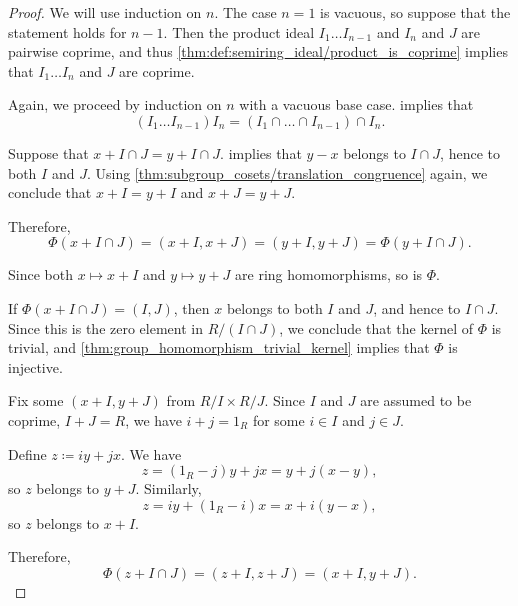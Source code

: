 \begin{proof}
   We will use induction on \( n \). The case \( n = 1 \) is vacuous, so suppose that the statement holds for \( n - 1 \). Then the product ideal \( I_1 \ldots I_{n-1} \) and \( I_n \) and \( J \) are pairwise coprime, and thus \cref{thm:def:semiring_ideal/product_is_coprime} implies that \( I_1 \ldots I_n \) and \( J \) are coprime.

   Again, we proceed by induction on \( n \) with a vacuous base case.  implies that
  \begin{equation*}
    (I_1 \ldots I_{n-1}) I_n = (I_1 \cap \ldots \cap I_{n-1}) \cap I_n.
  \end{equation*}

   Suppose that \( x + I \cap J = y + I \cap J \).  implies that \( y - x \) belongs to \( I \cap J \), hence to both \( I \) and \( J \). Using \cref{thm:subgroup_cosets/translation_congruence} again, we conclude that \( x + I = y + I \) and \( x + J = y + J \).

  Therefore,
  \begin{equation*}
    \Phi(x + I \cap J)
    =
    (x + I, x + J)
    =
    (y + I, y + J)
    =
    \Phi(y + I \cap J).
  \end{equation*}

   Since both \( x \mapsto x + I \) and \( y \mapsto y + J \) are ring homomorphisms, so is \( \Phi \).

   If \( \Phi(x + I \cap J) = (I, J) \), then \( x \) belongs to both \( I \) and \( J \), and hence to \( I \cap J \). Since this is the zero element in \( R / (I \cap J) \), we conclude that the kernel of \( \Phi \) is trivial, and \cref{thm:group_homomorphism_trivial_kernel} implies that \( \Phi \) is injective.

   Fix some \( (x + I, y + J) \) from \( R / I \times R / J \). Since \( I \) and \( J \) are assumed to be coprime, \( I + J = R \), we have \( i + j = 1_R \) for some \( i \in I \) and \( j \in J \).

  Define \( z \coloneqq iy + jx \). We have
  \begin{equation*}
    z = (1_R - j)y + jx = y + j(x - y),
  \end{equation*}
  so \( z \) belongs to \( y + J \). Similarly,
  \begin{equation*}
    z = iy + (1_R - i)x = x + i(y - x),
  \end{equation*}
  so \( z \) belongs to \( x + I \).

  Therefore,
  \begin{equation*}
    \Phi(z + I \cap J) = (z + I, z + J) = (x + I, y + J).
  \end{equation*}
\end{proof}

